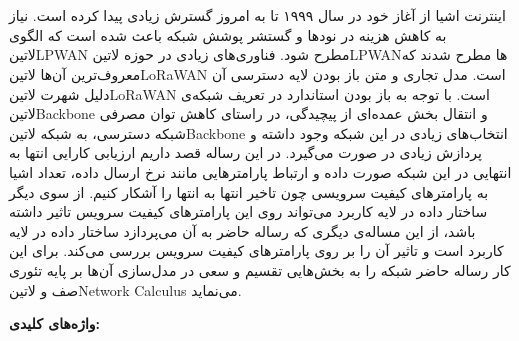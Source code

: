 \newpage\clearpage

\pagestyle{abstract}

\vspace*{-1cm}
\section*{\centering \abstractname}
\vspace*{.5cm}

اینترنت اشیا از آغاز خود در سال ۱۹۹۹ تا به امروز گسترش زیادی پیدا کرده است.
نیاز به کاهش هزینه در نودها و گستشر پوشش شبکه باعث شده است که الگوی ‌لاتین{LPWAN} مطرح شود.
فناوری‌های زیادی در حوزه ‌لاتین{LPWAN}ها مطرح شدند که معروف‌ترین آن‌ها ‌لاتین{LoRaWAN} است. مدل تجاری و متن باز بودن
لایه دسترسی آن دلیل شهرت ‌لاتین{LoRaWAN} است.
با توجه به باز بودن استاندارد در تعریف شبکه‌ی ‌لاتین{Backbone} و انتقال بخش عمده‌ای از پیچیدگی، در راستای کاهش توان مصرفی
شبکه دسترسی، به شبکه ‌لاتین{Backbone} انتخاب‌های زیادی در این شبکه وجود داشته و پردازش زیادی در صورت می‌گیرد.
در این رساله قصد داریم ارزیابی کارایی انتها به انتهایی در این شبکه صورت داده و ارتباط پارامترهایی مانند نرخ ارسال داده، تعداد اشیا
به پارامترهای کیفیت سرویسی چون تاخیر انتها به انتها را آشکار کنیم.
از سوی دیگر ساختار داده در لایه کاربرد می‌تواند روی این پارامترهای کیفیت سرویس تاثیر داشته باشد، از این مساله‌ی دیگری که رساله حاضر به آن می‌پردازد
ساختار داده در لایه کاربرد است و تاثیر آن را بر روی پارامترهای کیفیت سرویس بررسی می‌کند.
برای این کار رساله حاضر شبکه را به بخش‌هایی تقسیم و سعی در مدل‌سازی آن‌ها بر پایه تئوری صف و ‌لاتین{Network Calculus}
می‌نماید.


\vspace*{2cm}

{%
  \noindent\large\textbf{واژه‌های کلیدی:}
}\par
\vspace*{.5cm}

